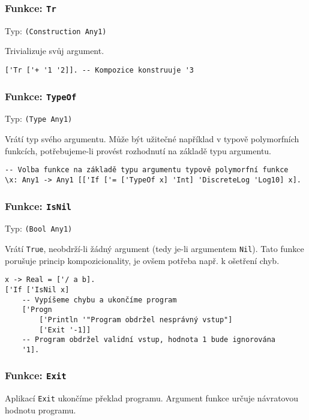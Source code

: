\subsubsection*{Funkce: \lstinline{Tr}}
Typ: \lstinline{(Construction Any1)}

Trivializuje svůj argument.

\begin{lstlisting}[caption={Ukázka využití Tr}]
['Tr ['+ '1 '2]]. -- Kompozice konstruuje '3
\end{lstlisting}

\subsubsection*{Funkce: \lstinline{TypeOf}}
Typ: \lstinline{(Type Any1)}

Vrátí typ svého argumentu. Může být užitečné například v typově polymorfních funkcích,
potřebujeme-li provést rozhodnutí na základě typu argumentu.

\begin{lstlisting}[caption={Ukázka využití TypeOf}]
-- Volba funkce na základě typu argumentu typově polymorfní funkce
\x: Any1 -> Any1 [['If ['= ['TypeOf x] 'Int] 'DiscreteLog 'Log10] x].
\end{lstlisting}

\subsubsection*{Funkce: \lstinline{IsNil}}
Typ: \lstinline{(Bool Any1)}

Vrátí \lstinline{True}, neobdrží-li žádný argument (tedy je-li argumentem \lstinline{Nil}). Tato
funkce porušuje princip kompozicionality, je ovšem potřeba např. k ošetření chyb.

\begin{lstlisting}[caption={Ukázka využití IsNil}]
x -> Real = ['/ a b].
['If ['IsNil x]
    -- Vypíšeme chybu a ukončíme program
    ['Progn
        ['Println '"Program obdržel nesprávný vstup"]
        ['Exit '-1]]
    -- Program obdržel validní vstup, hodnota 1 bude ignorována
    '1].
\end{lstlisting}

\subsubsection*{Funkce: \lstinline{Exit}}

Aplikací \lstinline{Exit} ukončíme překlad programu. Argument funkce určuje návratovou hodnotu
programu.

